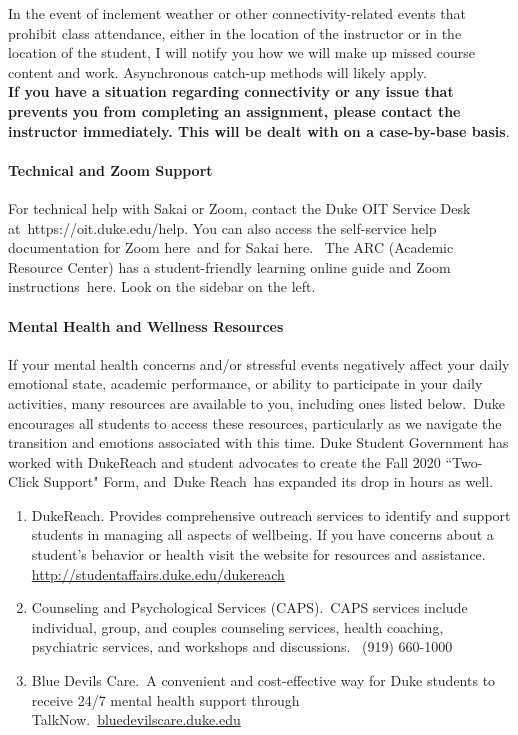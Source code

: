 \documentclass[11pt]{article}
\begin{document}
In the event of inclement weather or other connectivity-related events that prohibit class attendance, either in the location of the instructor or in the location of the student, I will notify you how we will make up missed course content and work.  Asynchronous catch-up methods will likely apply.\\

\textbf{If you have a situation regarding connectivity or any issue that prevents you from completing an assignment, please contact the instructor immediately. This will be dealt with on a case-by-base basis}. \\



\paragraph{Technical and Zoom Support}
For technical help with Sakai or Zoom, contact the Duke OIT Service Desk at https://oit.duke.edu/help. You can also access the self-service help documentation for Zoom here and for Sakai here.  The ARC (Academic Resource Center) has a student-friendly learning online guide and Zoom instructions here. Look on the sidebar on the left.\\

\paragraph{Mental Health and Wellness Resources}

If your mental health concerns and/or stressful events negatively affect your daily emotional state, academic performance, or ability to participate in your daily activities, many resources are available to you, including ones listed below. Duke encourages all students to access these resources, particularly as we navigate the transition and emotions associated with this time. Duke Student Government has worked with DukeReach and student advocates to create the Fall 2020 ``Two-Click Support" Form, and Duke Reach has expanded its drop in hours as well. 

\begin{enumerate}
\item DukeReach. Provides comprehensive outreach services to identify and support students in managing all aspects of wellbeing. If you have concerns about a student's behavior or health visit the website for resources and assistance. \url{http://studentaffairs.duke.edu/dukereach}
\item Counseling and Psychological Services (CAPS). CAPS services include individual, group, and couples counseling services, health coaching, psychiatric services, and workshops and discussions.  (919) 660-1000
\item Blue Devils Care. A convenient and cost-effective way for Duke students to receive 24/7 mental health support through TalkNow. \url{bluedevilscare.duke.edu}
\end{enumerate}
\end{document}
